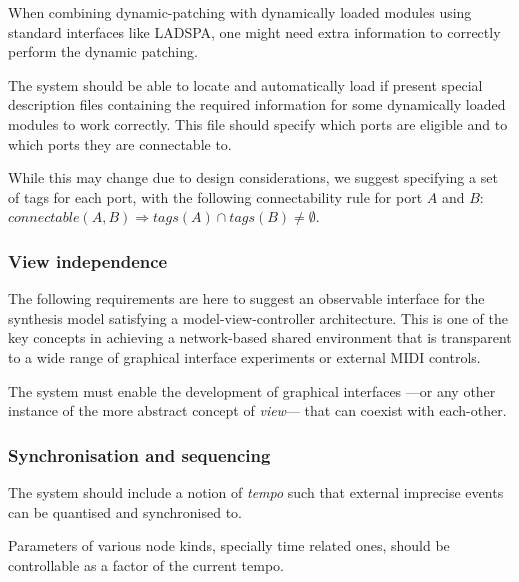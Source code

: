 When combining dynamic-patching with dynamically loaded modules
using standard interfaces like LADSPA, one might need extra
information to correctly perform the dynamic patching.

\begin{requirement}
  \label{req:iter3-end}
The system should be able to locate and automatically load if present
special description files containing the required information for
some dynamically loaded modules to work correctly. This file should
specify which ports are eligible and to which ports they are
connectable to. 
\end{requirement}

While this may change due to design considerations, we suggest
specifying a set of tags for each port, with the following
connectability rule for port $A$ and $B$: $connectable(A, B)
\Rightarrow tags(A) \cap tags(B) \neq \emptyset$. 

\subsubsection{View independence}

The following requirements are here to suggest an observable interface
for the synthesis model satisfying a model-view-controller
architecture. This is one of the key concepts in achieving a
network-based shared environment that is transparent to a wide range
of graphical interface experiments or external MIDI controls.

\begin{requirement}
  \label{req:views}
  The system must enable the development of graphical interfaces
  ---or any other instance of the more abstract concept of
  \emph{view}--- that can coexist with each-other.
\end{requirement}

\subsubsection{Synchronisation and sequencing}

\begin{requirement}
  \label{req:iter4-begin}
  The system should include a notion of \emph{tempo} such that external
  imprecise events can be quantised and synchronised to.
\end{requirement}

\begin{requirement}
  Parameters of various node kinds, specially time related ones,
  should be controllable as a factor of the current tempo.
\end{requirement}

